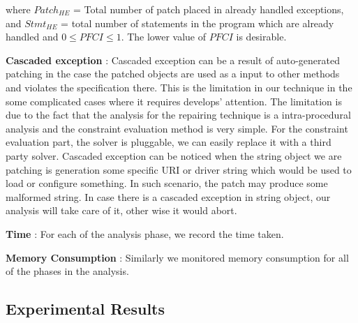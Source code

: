 \begin{mylist}
where $Patch_{HE}$ = Total number of patch placed in already handled exceptions,
and $Stmt_{HE}$ =  total number of statements in the program which are already
handled and $0 \le PFCI \le 1$. The lower value of $PFCI$ is desirable.


\item \textbf{Cascaded exception} : Cascaded exception can be a result of 
auto-generated patching in the case the patched objects are used as a input
to other methods and violates the specification there. This is the limitation
in our technique in the some complicated cases where it requires develops' 
attention. The limitation is due to the fact that the analysis for the
repairing 
technique is a intra-procedural analysis and the constraint evaluation method is
very simple. For the constraint evaluation part, the solver is pluggable, we can
easily replace it with a third party solver. Cascaded exception can be noticed 
when the string object we are patching is generation some specific URI or driver
string which would be used to load or configure something. In such scenario, the
patch may produce some malformed string. In case there is a cascaded exception 
in string object, our analysis will take care of it, other wise it would abort. 

\item \textbf{Time} : For each of the analysis phase, we record the time taken.

\item \textbf{Memory Consumption} : Similarly we monitored memory consumption
for all of the phases in the analysis.

\end{mylist}

\subsection{Experimental Results}
\label{subsec:experimentalResults}


